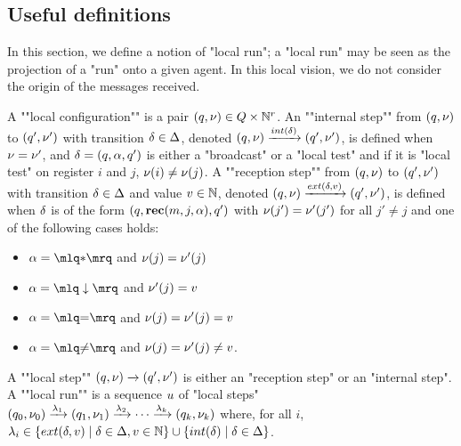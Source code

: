 \subsection{Useful definitions}
\label{sec:decidability-defs}

In this section, we define a notion of "local run"; a "local run" may be seen as the projection of a "run" onto a given agent. In this local vision, we do not consider the origin of the messages received.
	
\AP A ""local configuration"" is a pair $(q, \nu) \in Q \times \mathbb{N}^r$.  
\AP An ""internal step"" from $(q,\nu)$ to $(q',\nu')$ with transition $\delta \in \Delta$, denoted $(q,\localdata) \intstep{\atrans} (q',\localdata')$, is defined when $\nu = \nu'$, and $\delta =(q, \alpha, q')$ is either a "broadcast" or a "local test" and if it is "local test" on register $i$ and $j$, $\nu(i) \ne \nu(j)$.  
\AP A ""reception step"" from $(q,\nu)$ to $(q',\nu')$ with transition $\delta \in \Delta$ and value $v \in \mathbb{N}$, denoted $(q,\localdata) \extbr{\atrans}{\aval} (q',\localdata')$, is defined when $\delta$ is of the form $(q,\textbf{rec}(m, j, \alpha),q')$ with $\nu(j') = \nu'(j')$ for all $j' \neq j$ and one of the following cases holds:
	
	\begin{minipage}[t]{6cm}
		\begin{itemize}
			\item $\anact = \quotemarks{\dummyact}$ 
			and $\nu(j) = \nu'(j)$
			\item $\anact = \quotemarks{\enregact}$ and $\nu'(j) = v$
		\end{itemize}
	\end{minipage}
	\begin{minipage}[t]{6cm}
		\begin{itemize}
			\item $\anact = \quotemarks{\eqtestact}$ and $\nu(j) = \nu'(j)= v$
			\item $\anact = \quotemarks{\diseqtestact}$ and $\nu(j) = \nu'(j) \ne v$.
		\end{itemize}
	\end{minipage}
	

	\AP A ""local step"" $(q,\nu) \xrightarrow{} (q',\nu')$ is either an "reception step" or an "internal step". 
	\AP A ""local run"" is a sequence $u$ of "local steps" $(q_0, \nu_0) \xrightarrow{\lambda_1} (q_1, \nu_1) \xrightarrow{\lambda_2} \cdots \xrightarrow{\lambda_k} (q_k, \nu_k)$ where, for all $i$, $\locallabel_i \in \set{\extlabel{\atrans}{\aval} \mid \atrans \in \transitions, \aval \in \nats} \cup \set{\intlabel{\atrans} \mid \atrans \in \transitions}$. 

